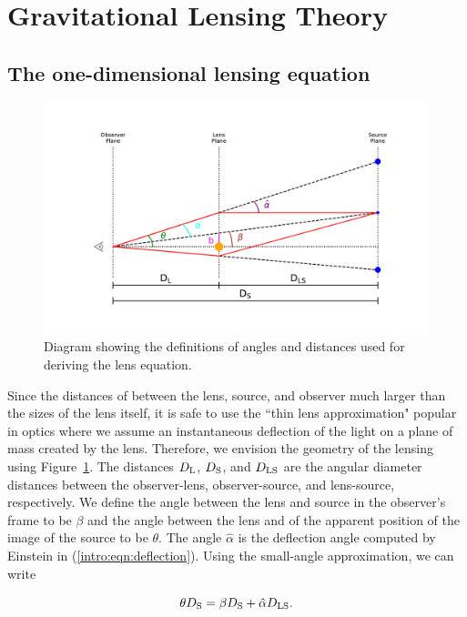 \section{Gravitational Lensing Theory}

\subsection{The one-dimensional lensing equation}

\begin{figure}
\includegraphics[width=\textwidth, trim=75pt 75pt 75pt 75pt]{Intro/lens_diagram.pdf}
\caption[Diagram of gravitational lensing parameters]{Diagram showing the definitions of angles and distances used for deriving the lens equation.}
\label{intro:fig:diagram}
\end{figure}

Since the distances of between the lens, source, and observer much larger than the sizes of the lens itself, it is safe to use the ``thin lens approximation" popular in optics where we assume an instantaneous deflection of the light on a plane of mass created by the lens. Therefore, we envision the geometry of the lensing using Figure~\ref{intro:fig:diagram}. The distances $D_\mathrm{L}$, $D_\mathrm{S}$, and $D_\mathrm{LS}$ are the angular diameter distances between the observer-lens, observer-source, and lens-source, respectively. We define the angle between the lens and source in the observer's frame to be $\beta$ and the angle between the lens and of the apparent position of the image of the source to be $\theta$. The angle $\hat\alpha$ is the deflection angle computed by Einstein in (\ref{intro:eqn:deflection}). Using the small-angle approximation, we can write

\begin{equation}
\theta D_\mathrm{S} = \beta D_\mathrm{S} + \hat\alpha D_\mathrm{LS}.
\end{equation}

